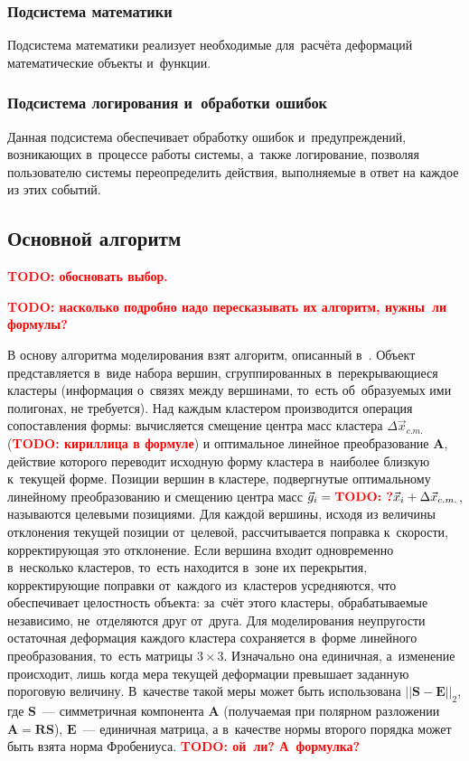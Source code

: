 \documentclass[a4paper, 14pt, titlepage]{extarticle}
\newcommand{\todo}[1]{\textbf{\textcolor{red}{TODO: #1}}}
\newcommand{\vect}[1]{\vec{#1}}
\newcommand{\matrx}[1]{\mathbf{#1}}
\begin{document}
      \subsubsection{Подсистема математики}

        Подсистема математики реализует необходимые для~расчёта деформаций математические объекты
        и~функции.

      \subsubsection{Подсистема логирования и~обработки ошибок}

        Данная подсистема обеспечивает обработку ошибок и~предупреждений, возникающих в~процессе
        работы системы, а~также логирование, позволяя пользователю системы переопределить действия,
        выполняемые в ответ на каждое из этих событий.

    \subsection{Основной алгоритм}

      \todo{обосновать выбор.}
      
      \todo{насколько подробно надо пересказывать их алгоритм, нужны~ли формулы?}

      В основу алгоритма моделирования взят алгоритм, описанный в~\cite{mueller-meshless}. Объект
      представляется в~виде набора вершин, сгруппированных в~перекрывающиеся кластеры (информация
      о~связях между вершинами, то~есть об~образуемых ими полигонах, не требуется). Над каждым
      кластером производится операция сопоставления формы: вычисляется смещение центра масс кластера
      $\Delta \vect{x}_{c.m.}$ (\todo{кириллица в формуле}) и оптимальное линейное преобразование
      $\matrx A$, действие которого переводит исходную форму кластера в~наиболее близкую к~текущей
      форме. Позиции вершин в кластере, подвергнутые оптимальному линейному преобразованию и
      смещению центра масс $\vect{g}_i = \matrx{\todo{?}} \vect{x}_i + \Delta \vect{x}_{c.m.}$,
      называются целевыми позициями. Для каждой вершины, исходя из величины отклонения текущей
      позиции от~целевой, рассчитывается поправка к~скорости, корректирующая это отклонение. Если
      вершина входит одновременно в~несколько кластеров, то~есть находится в~зоне их перекрытия,
      корректирующие поправки от~каждого из~кластеров усредняются, что обеспечивает целостность
      объекта: за~счёт этого кластеры, обрабатываемые независимо, не~отделяются друг от~друга. Для
      моделирования неупругости остаточная деформация каждого кластера сохраняется в~форме линейного
      преобразования, то~есть матрицы $3 \times 3$. Изначально она единичная, а~изменение
      происходит, лишь когда мера текущей деформации превышает заданную пороговую величину. В~качестве
      такой меры может быть использована $ ||\matrx S - \matrx E||_2 $, где $\matrx S$~---
      симметричная компонента $\matrx A$ (получаемая при полярном разложении $\matrx A = \matrx R
      \matrx S$), $\matrx E$~--- единичная матрица, а в~качестве нормы второго порядка может быть
      взята норма Фробениуса. \todo{ой~ли? А~формулка?}
\end{document}

